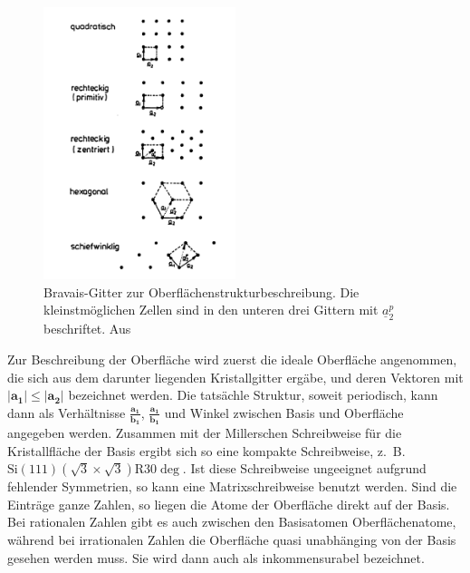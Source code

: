 \begin{figure}
    \includegraphics[width=0.5\textwidth]{pics_theo/Bravais}
    \caption{Bravais-Gitter zur Oberflächenstrukturbeschreibung. Die kleinstmöglichen
Zellen sind in den unteren drei Gittern mit $\underline{a}_2^p$ beschriftet. 
Aus \cite{henzler1991oberflachenphysik} }
    \label{fig:Bravais}
\end{figure} 

Zur Beschreibung der Oberfläche wird zuerst die ideale Oberfläche angenommen, 
die sich aus dem darunter liegenden Kristallgitter ergäbe, und deren Vektoren mit
$|\mathbf{a_1}| \le |\mathbf{a_2}|$ bezeichnet werden. Die tatsächle Struktur, 
soweit periodisch, kann dann als Verhältnisse $\frac{\mathbf{a_1}}{\mathbf{b_1}}$, 
$\frac{\mathbf{a_1}}{\mathbf{b_1}}$ und Winkel zwischen Basis und Oberfläche angegeben 
werden. Zusammen mit der Millerschen Schreibweise für die Kristallfläche der Basis 
ergibt sich so eine kompakte Schreibweise, z.~B. 
$\mathrm{Si}(111)(\sqrt{3} \times \sqrt{3}) \mathrm{R} 30 \deg$. 
Ist diese Schreibweise ungeeignet aufgrund fehlender Symmetrien, so kann eine 
Matrixschreibweise benutzt werden. Sind die Einträge ganze Zahlen, so liegen die 
Atome der Oberfläche direkt auf der Basis. Bei rationalen Zahlen gibt es auch 
zwischen den Basisatomen Oberflächenatome, während bei irrationalen Zahlen die 
Oberfläche quasi unabhänging von der Basis gesehen werden muss. Sie wird dann auch 
als inkommensurabel bezeichnet. \cite{henzler1991oberflachenphysik}

